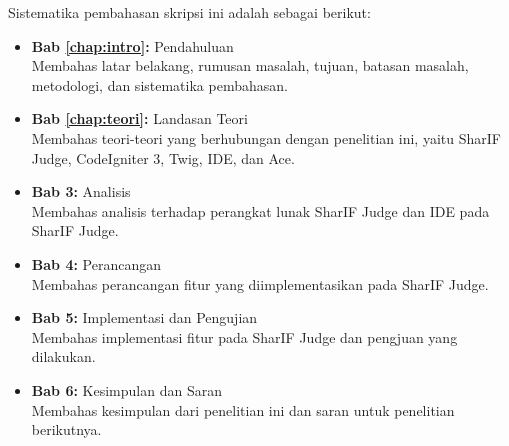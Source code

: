 Sistematika pembahasan skripsi ini adalah sebagai berikut:
\begin{itemize}
    \item \textbf{Bab \ref{chap:intro}:} Pendahuluan \\
          Membahas latar belakang, rumusan masalah, tujuan, batasan masalah, metodologi, dan sistematika pembahasan.
    \item \textbf{Bab \ref{chap:teori}:} Landasan Teori \\
          Membahas teori-teori yang berhubungan dengan penelitian ini, yaitu SharIF Judge, CodeIgniter 3, Twig, IDE, dan Ace.
    \item \textbf{Bab 3:} Analisis \\
          Membahas analisis terhadap perangkat lunak SharIF Judge dan IDE pada SharIF Judge.
    \item \textbf{Bab 4:} Perancangan \\
          Membahas perancangan fitur yang diimplementasikan pada SharIF Judge.
    \item \textbf{Bab 5:} Implementasi dan Pengujian \\
          Membahas implementasi fitur pada SharIF Judge dan pengjuan yang dilakukan.
    \item \textbf{Bab 6:} Kesimpulan dan Saran \\
          Membahas kesimpulan dari penelitian ini dan saran untuk penelitian berikutnya.
\end{itemize}